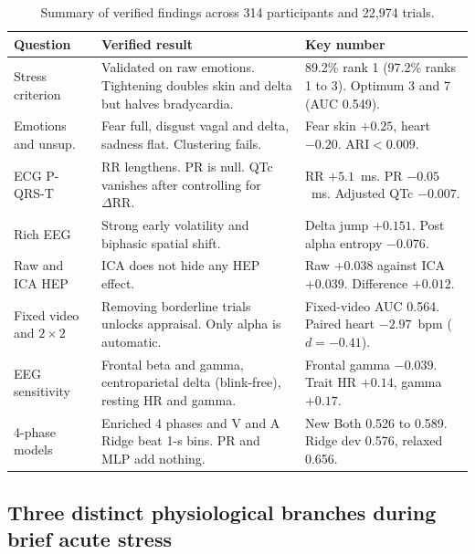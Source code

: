 \documentclass[10pt]{article}
\begin{document}
\begin{table}[t]
\centering\footnotesize
\begin{tabularx}{\linewidth}{@{}L{2.55cm} Y L{4.7cm}@{}}
\toprule
Question & Verified result & Key number\\
\midrule
Stress criterion & Validated on raw emotions. Tightening doubles skin and delta but halves bradycardia. & 89.2\% rank 1 (97.2\% ranks 1 to 3). Optimum 3 and 7 (AUC 0.549).\\
Emotions and unsup. & Fear full, disgust vagal and delta, sadness flat. Clustering fails. & Fear skin $+0.25$, heart $-0.20$. $\mathrm{ARI} < 0.009$.\\
ECG P-QRS-T & RR lengthens. PR is null. QTc vanishes after controlling for $\Delta\mathrm{RR}$. & RR $+5.1$~ms. PR $-0.05$~ms. Adjusted QTc $-0.007$.\\
Rich EEG & Strong early volatility and biphasic spatial shift. & Delta jump $+0.151$. Post alpha entropy $-0.076$.\\
Raw and ICA HEP & ICA does not hide any HEP effect. & Raw $+0.038$ against ICA $+0.039$. Difference $+0.012$.\\
Fixed video and $2\times 2$ & Removing borderline trials unlocks appraisal. Only alpha is automatic. & Fixed-video AUC 0.564. Paired heart $-2.97$~bpm ($d = -0.41$).\\
EEG sensitivity & Frontal beta and gamma, centroparietal delta (blink-free), resting HR and gamma. & Frontal gamma $-0.039$. Trait HR $+0.14$, gamma $+0.17$.\\
4-phase models & Enriched 4 phases and V and A Ridge beat 1-s bins. PR and MLP add nothing. & New Both 0.526 to 0.589. Ridge dev 0.576, relaxed 0.656.\\
\bottomrule
\end{tabularx}
\caption{Summary of verified findings across 314 participants and 22,974 trials.}
\label{tab:summary}
\end{table}

\subsection{Three distinct physiological branches during brief acute stress}
\end{document}
